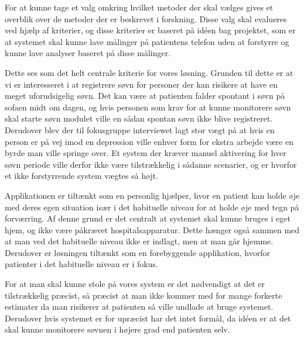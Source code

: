For at kunne tage et valg omkring hvilket metoder der skal vælges gives et overblik over de metoder der er beskrevet i forskning.
Disse valg skal evalueres ved hjælp af kriterier, og disse kriterier er baseret på idéen bag projektet, som er at systemet skal kunne lave målinger på patientens telefon uden at forstyrre og kunne lave analyser baseret på disse målinger. 

\begin{description}[style=nextline]
\item[Undgå bruger intervention og måle søvn uden at forstyrre]
Dette ses som det helt centrale kriterie for vores løsning.
Grunden til dette er at vi er interesseret i at registrere søvn for personer der kan risikere at have en meget uforudsigelig søvn. Det kan være at patienten falder spontant i søvn på sofaen midt om dagen, og hvis personen som krav for at kunne monitorere søvn skal starte søvn modulet ville en sådan spontan søvn ikke blive registreret.
Derudover blev der til fokusgruppe interviewet \citep[Kapitel 1, Sektion 5]{misc:faellesrapp} lagt stor vægt på at hvis en person er på vej imod en depression ville enhver form for ekstra arbejde være en byrde man ville springe over.
Et system der kræver manuel aktivering for hver søvn periode ville derfor ikke være tilstrækkelig i sådanne scenarier, og er hvorfor et ikke forstyrrende system vægtes så højt.

\item[Kunne bruges af brugere i deres eget hjem]
Applikationen er tiltænkt som en personlig hjælper, hvor en patient kan holde øje med deres egen situation især i det habituelle niveau for at holde øje med tegn på forværring.
Af denne grund er det centralt at systemet skal kunne bruges i eget hjem, og ikke være påkrævet hospitalsapparatur.
Dette hænger også sammen med at man ved det habituelle niveau ikke er indlagt, men at man går hjemme.
Derudover er løsningen tiltænkt som en forebyggende applikation, hvorfor patienter i det habituelle niveau er i fokus.

\item[Være præcis og hvis den kan måle søvnforstyrrelser er dette en fordel]
For at man skal kunne stole på vores system er det nødvendigt at det er tilstrækkelig præcist, så præcist at man ikke kommer med for mange forkerte estimater da man risikerer at patienten så ville undlade at bruge systemet. 
Derudover hvis systemet er for upræcist har det intet formål, da idéen er at det skal kunne monitorere søvnen i højere grad end patienten selv.
\end{description}

